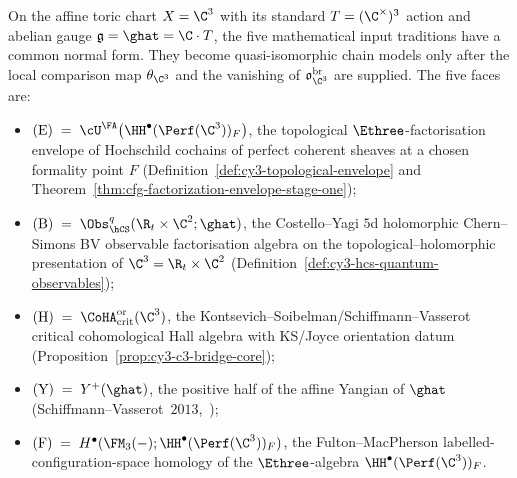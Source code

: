 On the affine toric chart $X=\C^3$ with its standard $T=(\C^\times)^3$
action and abelian gauge $\mathfrak g=\ghat=\C\cdot T$, the five
mathematical input traditions have a common normal form. They become
quasi-isomorphic chain models only after the local comparison map
$\theta_{\C^3}$ and the vanishing of
$\mathfrak o_{\C^3}^{\mathrm{br}}$ are supplied.
The five faces are:
\begin{itemize}
\item $(\mathrm E) \;=\; \cU^\FA\bigl(\HH^\bullet(\Perf(\C^3))_F\bigr)$,
the topological $\Ethree$-factorisation envelope of Hochschild cochains
of perfect coherent sheaves at a chosen formality point $F$
\textup{(}Definition~\ref{def:cy3-topological-envelope} and
Theorem~\ref{thm:cfg-factorization-envelope-stage-one}\textup{)};
\item $(\mathrm B) \;=\; \Obs_{\hCS}^{q}(\R_t\times\C^2;\ghat)$,
the Costello--Yagi $5$d holomorphic Chern--Simons BV observable
factorisation algebra on the topological--holomorphic presentation of
$\C^3=\R_t\times\C^2$
\textup{(}Definition~\ref{def:cy3-hcs-quantum-observables}\textup{)};
\item $(\mathrm H) \;=\; \CoHA_{\mathrm{crit}}^{\mathrm{or}}(\C^3)$,
the Kontsevich--Soibelman/Schiffmann--Vasserot critical cohomological
Hall algebra with KS/Joyce orientation datum
\textup{(}Proposition~\ref{prop:cy3-c3-bridge-core}\textup{)};
\item $(\mathrm Y) \;=\; Y^+(\ghat)$, the positive half of the affine
Yangian of $\ghat$
\textup{(}Schiffmann--Vasserot~$2013$,~\cite{SV13}\textup{)};
\item $(\mathrm F) \;=\; H^\bullet(\FM_3(-);\HH^\bullet(\Perf(\C^3))_F)$,
the Fulton--MacPherson labelled-configuration-space homology of the
$\Ethree$-algebra $\HH^\bullet(\Perf(\C^3))_F$.
\end{itemize}

